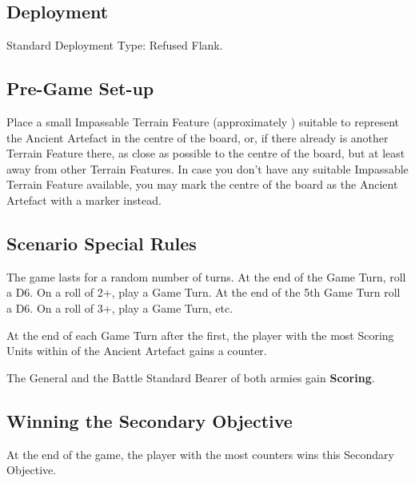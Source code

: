 
\label{AncientArtefact}


\subsection*{Deployment}

Standard Deployment Type: Refused Flank.

\subsection*{Pre-Game Set-up}

Place a small Impassable Terrain Feature (approximately ) suitable to represent the Ancient Artefact in the centre of the board, or, if there already is another Terrain Feature there, as close as possible to the centre of the board, but at least  away from other Terrain Features. In case you don't have any suitable Impassable Terrain Feature available, you may mark the centre of the board as the Ancient Artefact with a marker instead.


\subsection*{Scenario Special Rules}

The game lasts for a random number of turns. At the end of the  Game Turn, roll a D6. On a roll of 2+, play a  Game Turn. At the end of the 5th Game Turn roll a D6. On a roll of 3+, play a  Game Turn, etc.

At the end of each Game Turn after the first, the player with the most Scoring Units within  of the Ancient Artefact gains a counter.

The General and the Battle Standard Bearer of both armies gain \textbf{Scoring}.

\subsection*{Winning the Secondary Objective}

At the end of the game, the player with the most counters wins this Secondary Objective.


